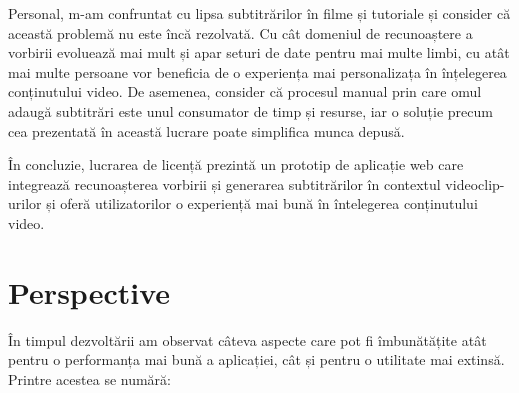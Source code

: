 \par
Personal, m-am confruntat cu lipsa subtitrărilor în filme și tutoriale și consider că această
problemă nu este încă rezolvată. Cu cât domeniul de recunoaștere a vorbirii evoluează mai mult
și apar seturi de date pentru mai multe limbi, cu atât mai multe persoane vor beneficia de o 
experiența mai personalizața în înțelegerea conținutului video. De asemenea, consider că procesul
manual prin care omul adaugă subtitrări este unul consumator de timp și resurse, iar o soluție
precum cea prezentată în această lucrare poate simplifica munca depusă.
\par
În concluzie, lucrarea de licență prezintă un prototip de aplicație web care integrează
recunoașterea vorbirii și generarea subtitrărilor în contextul videoclip-urilor și oferă
utilizatorilor o experiență mai bună în întelegerea conținutului video.

\section{Perspective}
\par
În timpul dezvoltării am observat câteva aspecte care pot fi îmbunătățite atât pentru o 
performanța mai bună a aplicației, cât și pentru o utilitate mai extinsă. Printre acestea
se numără:


